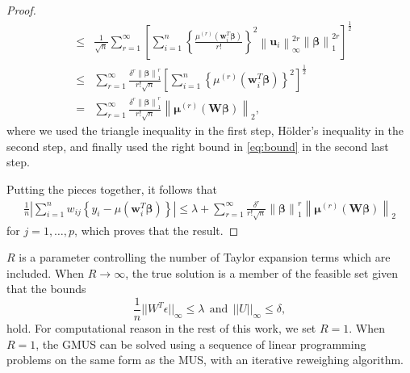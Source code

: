 \documentclass[a4paper,12pt,openany]{report}
\theoremstyle{plain}
\theoremstyle{plain}
\theoremstyle{plain}
\theoremstyle{plain}
\theoremstyle{plain}
\theoremstyle{plain}
\theoremstyle{plain}
\theoremstyle{plain}
\theoremstyle{plain}
\theoremstyle{plain}
\theoremstyle{plain}
\theoremstyle{plain}
\begin{document}
\begin{proof}
\begin{align*}
	 & \leq&
	 \frac{1}{\sqrt{n}} \sum_{r=1}^{\infty} \left[ \sum_{i=1}^{n}\left\{\frac{\mu^{(r)}\left( \mathbf{w}_{i}^{T}\boldsymbol{\beta}\right)}{r!} \right\}^{2} \left\|\mathbf{u}_{i}\right\|_{\infty}^{2r} \left\|\boldsymbol{\beta}\right\|_{1}^{2r}\right]^{\frac{1}{2}}\\
	 & \leq & \sum_{r=1}^{\infty}\frac{\delta^{r}\left\|\boldsymbol{\beta}\right\|_{1}^{r}}{r!\sqrt{n}}  \left[ \sum_{i=1}^{n}\left\{\mu^{(r)}\left( \mathbf{w}_{i}^{T}\boldsymbol{\beta}\right) \right\}^{2}  \right]^{\frac{1}{2}}\\
	 & =&  \sum_{r=1}^{\infty}\frac{\delta^{r}\left\|\boldsymbol{\beta}\right\|_{1}^{r}}{r!\sqrt{n}} \left\|\boldsymbol{\mu}^{(r)}\left(\mathbf{W}\boldsymbol{\beta} \right) \right\|_{2} ,
	\end{align*}
	where we used the triangle inequality in the first step, H\"older's inequality in the second step, and finally used the right bound in \eqref{eq:bound} in the second last step.
	
	Putting the pieces together, it follows that
	\begin{align*}
	\frac{1}{n}\left|\sum_{i=1}^{n} w_{ij}\left\{y_{i} - \mu\left(\mathbf{w}_{i}^{T}\boldsymbol{\beta} \right) \right\} \right| \leq  \lambda +\sum_{r=1}^{\infty}\frac{\delta^{r}}{r!\sqrt{n}} \left\|\boldsymbol{\beta}\right\|_{1}^{r} \left\|\boldsymbol{\mu}^{(r)}\left(\mathbf{W}\boldsymbol{\beta} \right) \right\|_{2} 
	\end{align*}
	for $j=1,\dots,p$, which proves that the result.
\end{proof}
 $R$ is a parameter controlling the number of Taylor expansion terms which are included. When $R\to\infty$, the true solution is a member of the feasible set given that the bounds
\begin{equation}
\frac{1}{n}||W^T\epsilon||_{\infty}\leq \lambda \ \ \text{and} \ \  ||U||_{\infty} \leq \delta,
\end{equation}
hold. For computational reason in the rest of this work, we set $R=1$. When $R=1$, the GMUS can be solved using a sequence of linear programming problems on the same form as the MUS, with an iterative reweighing algorithm.
\end{document}
